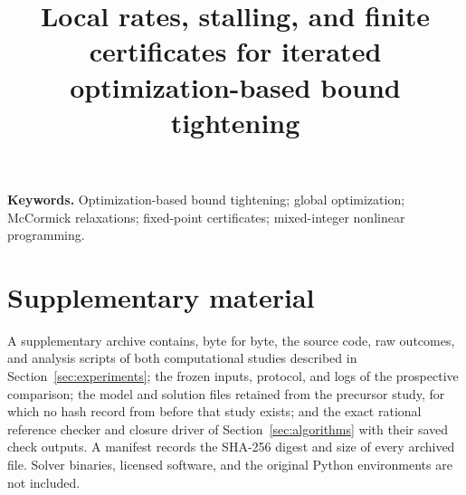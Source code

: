 \documentclass[11pt]{article}
\title{Local rates, stalling, and finite certificates for iterated
optimization-based bound tightening}
\author{}
\date{}
\theoremstyle{definition}
\theoremstyle{remark}
\begin{document}
\maketitle



\noindent\textbf{Keywords.} Optimization-based bound tightening;
global optimization; McCormick relaxations; fixed-point certificates;
mixed-integer nonlinear programming.
\par\medskip














\section*{Supplementary material}

A supplementary archive contains, byte for byte, the source code, raw
outcomes, and analysis scripts of both computational studies described in
Section~\ref{sec:experiments}; the frozen inputs, protocol, and logs of the
prospective comparison; the model and solution files retained from the
precursor study, for which no hash record from before that study exists;
and the exact rational reference checker and closure driver of
Section~\ref{sec:algorithms} with their saved check outputs. A manifest
records the SHA-256 digest and size of every archived file. Solver binaries,
licensed software, and the original Python environments are not included.

\appendix








\end{document}
